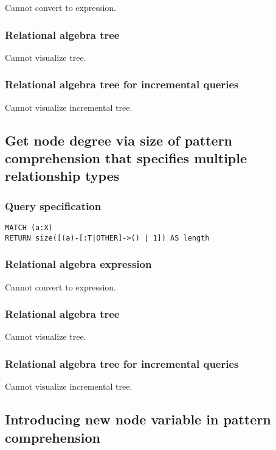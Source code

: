Cannot convert to expression.

\subsubsection*{Relational algebra tree}

Cannot visualize tree.

\subsubsection*{Relational algebra tree for incremental queries}

Cannot visualize incremental tree.

\subsection{Get node degree via size of pattern comprehension that specifies multiple relationship types}

\subsubsection*{Query specification}

\begin{lstlisting}
MATCH (a:X)
RETURN size([(a)-[:T|OTHER]->() | 1]) AS length
\end{lstlisting}

\subsubsection*{Relational algebra expression}

Cannot convert to expression.

\subsubsection*{Relational algebra tree}

Cannot visualize tree.

\subsubsection*{Relational algebra tree for incremental queries}

Cannot visualize incremental tree.

\subsection{Introducing new node variable in pattern comprehension}

